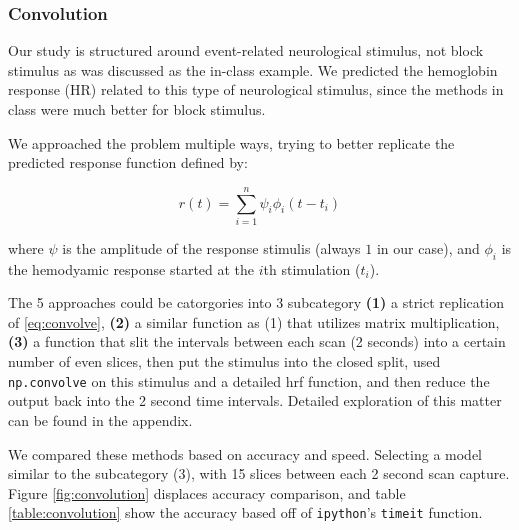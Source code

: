 \subsubsection{Convolution}
\par \indent Our study is structured around event-related neurological 
stimulus, not block stimulus as was discussed as the in-class example. We 
predicted the hemoglobin response (HR) related to this type of neurological 
stimulus, since the methods in class were much better for block stimulus. 

We approached the problem multiple ways, trying to better replicate the 
predicted response function defined by:

\begin{equation} \label{eq:convolve}
r(t)= \sum_{i=1}^n \psi_{i} \phi_{i}(t-t_i)
\end{equation}

where $\psi$ is the amplitude of the response stimulis (always $1$ in our case),
 and $\phi_{i}$ is the hemodyamic response started at the $i$th  stimulation 
 ($t_i$).

The 5 approaches could be catorgories into 3 subcategory \textbf{(1)} a strict replication of \ref{eq:convolve}, \textbf{(2)} a similar function as (1) that 
utilizes matrix multiplication, \textbf{(3)} a function that slit the intervals 
between each scan (2 seconds) into a certain number of even slices, then put 
the stimulus into the closed split, used \texttt{np.convolve} on this stimulus 
and a detailed hrf function, and then reduce the output back into the 2 second 
time intervals. Detailed exploration of this matter can be found in the 
appendix.

We compared these methods based on accuracy and speed. Selecting a model similar
to the subcategory (3), with 15 slices between each 2 second scan capture. Figure
\ref{fig:convolution} displaces accuracy comparison, and table 
\ref{table:convolution} show the accuracy based off of \texttt{ipython}'s 
\texttt{timeit} function.



